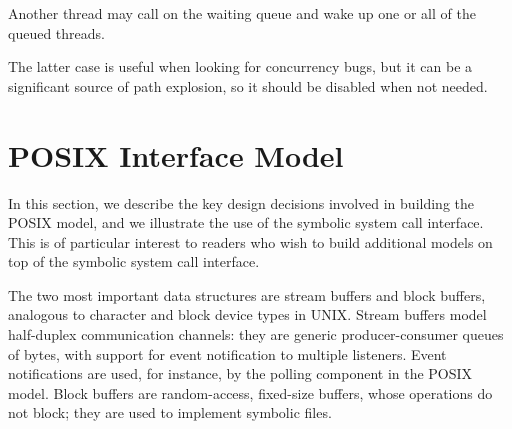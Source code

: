   Another thread may call  on the waiting queue and wake up one or all of the queued threads.

 The latter case is useful when looking for concurrency bugs, but it can be a significant source of path explosion, so it should be disabled when not needed.




\section{POSIX Interface Model}

In this section, we describe the key design decisions involved in building the \cnine POSIX model, and we illustrate the use of the symbolic system call interface.  This is of particular interest to readers who wish to build additional models on top of the \cnine symbolic system call interface.

  The two most important data structures are stream buffers and block buffers, analogous to character and block device types in UNIX.  Stream buffers model half-duplex communication channels: they are generic producer-consumer queues of bytes, with support for event notification to multiple listeners.  Event notifications are used, for instance, by the polling component in the POSIX model.  Block buffers are random-access, fixed-size buffers, whose operations do not block; they are used to implement symbolic files.

